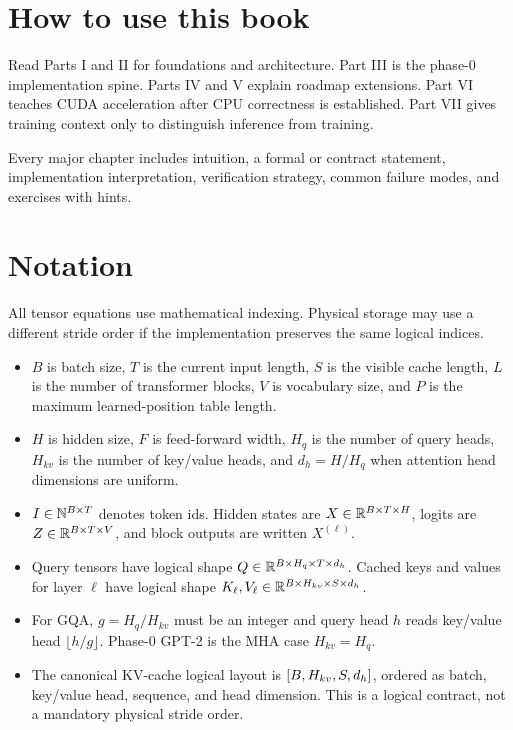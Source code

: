 \chapter*{How to use this book}
Read Parts I and II for foundations and architecture. Part III is the phase-0 implementation spine. Parts IV and V explain roadmap extensions. Part VI teaches CUDA acceleration after CPU correctness is established. Part VII gives training context only to distinguish inference from training.

Every major chapter includes intuition, a formal or contract statement, implementation interpretation, verification strategy, common failure modes, and exercises with hints.

\chapter*{Notation}
All tensor equations use mathematical indexing. Physical storage may use a different stride order if the implementation preserves the same logical indices.

\begin{itemize}
\item \(B\) is batch size, \(T\) is the current input length, \(S\) is the visible cache length, \(L\) is the number of transformer blocks, \(V\) is vocabulary size, and \(P\) is the maximum learned-position table length.
\item \(H\) is hidden size, \(F\) is feed-forward width, \(H_q\) is the number of query heads, \(H_{kv}\) is the number of key/value heads, and \(d_h=H/H_q\) when attention head dimensions are uniform.
\item \(I\in\mathbb{N}^{B\times T}\) denotes token ids. Hidden states are \(X\in\mathbb{R}^{B\times T\times H}\), logits are \(Z\in\mathbb{R}^{B\times T\times V}\), and block outputs are written \(X^{(\ell)}\).
\item Query tensors have logical shape \(Q\in\mathbb{R}^{B\times H_q\times T\times d_h}\). Cached keys and values for layer \(\ell\) have logical shape \(K_\ell,V_\ell\in\mathbb{R}^{B\times H_{kv}\times S\times d_h}\).
\item For GQA, \(g=H_q/H_{kv}\) must be an integer and query head \(h\) reads key/value head \(\lfloor h/g\rfloor\). Phase-0 GPT-2 is the MHA case \(H_{kv}=H_q\).
\item The canonical KV-cache logical layout is \(\left[B,H_{kv},S,d_h\right]\), ordered as batch, key/value head, sequence, and head dimension. This is a logical contract, not a mandatory physical stride order.
\end{itemize}

